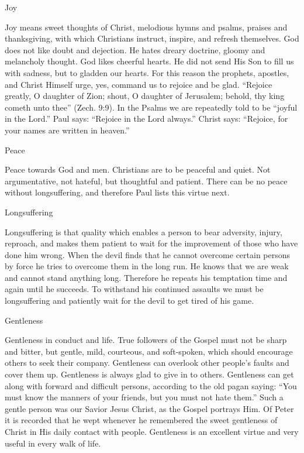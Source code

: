 Joy

Joy means sweet thoughts of Christ, melodious hymns and psalms, praises and thanksgiving, with which Christians instruct, inspire, and refresh themselves. God does not like doubt and dejection. He hates dreary doctrine, gloomy and melancholy thought. God likes cheerful hearts. He did not send His Son to fill us with sadness, but to gladden our hearts. For this reason the prophets, apostles, and Christ Himself urge, yes, command us to rejoice and be glad. “Rejoice greatly, O daughter of Zion; shout, O daughter of Jerusalem; behold, thy king cometh unto thee” (Zech. 9:9). In the Psalms we are repeatedly told to be “joyful in the Lord.” Paul says: “Rejoice in the Lord always.” Christ says: “Rejoice, for your names are written in heaven.”

Peace

Peace towards God and men. Christians are to be peaceful and quiet. Not argumentative, not hateful, but thoughtful and patient. There can be no peace without longsuffering, and therefore Paul lists this virtue next.

Longsuffering

Longsuffering is that quality which enables a person to bear adversity, injury, reproach, and makes them patient to wait for the improvement of those who have done him wrong. When the devil finds that he cannot overcome certain persons by force he tries to overcome them in the long run. He knows that we are weak and cannot stand anything long. Therefore he repeats his temptation time and again until he succeeds. To withstand his continued assaults we must be longsuffering and patiently wait for the devil to get tired of his game.

Gentleness

Gentleness in conduct and life. True followers of the Gospel must not be sharp and bitter, but gentle, mild, courteous, and soft-spoken, which should encourage others to seek their company. Gentleness can overlook other people’s faults and cover them up. Gentleness is always glad to give in to others. Gentleness can get along with forward and difficult persons, according to the old pagan saying: “You must know the manners of your friends, but you must not hate them.” Such a gentle person was our Savior Jesus Christ, as the Gospel portrays Him. Of Peter it is recorded that he wept whenever he remembered the sweet gentleness of Christ in His daily contact with people. Gentleness is an excellent virtue and very useful in every walk of life.


